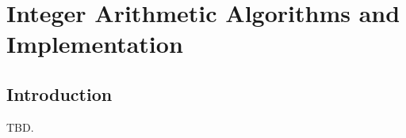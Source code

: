 \chapter{Integer Arithmetic Algorithms and Implementation}        
\label{caal0}

\section{Introduction}
\label{caal0:sint0}

TBD.


